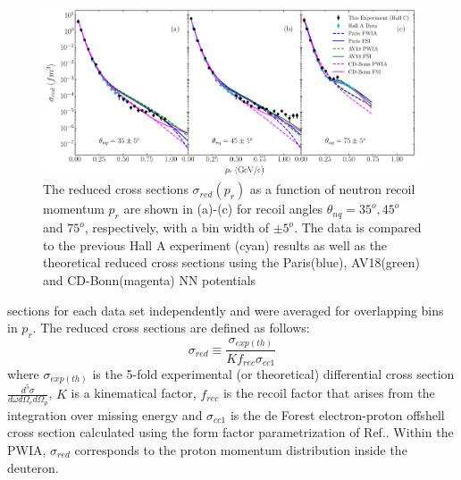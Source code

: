 \begin{center}
\begin{figure}[hb!]
\includegraphics[scale=0.46]{../prl_plots/PRL_plot1.pdf}
\caption{The reduced cross sections $\sigma_{red}(p_{r})$ as a function of neutron recoil momentum $p_{r}$ are shown in (a)-(c) for recoil angles $\theta_{nq}=35^{o}, 45^{o}$ and $75^{o}$, respectively,
with a bin width of $\pm 5^{o}$. The data is compared to the previous Hall A experiment (cyan) results\cite{PhysRevLett.107.262501} as well as the theoretical reduced cross sections using the Paris(blue),
AV18(green) and CD-Bonn(magenta) NN potentials}
\label{fig:fig1}
\end{figure}
\end{center}
\twocolumngrid
\noindent sections for each data set independently and were averaged for overlapping bins in $p_{r}$. The reduced cross sections are defined as follows:
\begin{equation}
\sigma_{red} \equiv \frac{\sigma_{exp(th)}}{Kf_{rec}\sigma_{cc1}}
\label{eq:1}
\end{equation}
where $\sigma_{exp(th)}$ is the 5-fold experimental (or theoretical) differential cross section $\frac{d^{5}\sigma}{d\omega d\Omega_{e} d\Omega_{p}}$, $K$ is a kinematical factor, $f_{rec}$ is the recoil factor that arises from the
integration over missing energy and $\sigma_{cc1}$ is the de Forest\cite{DEFOREST1983} electron-proton offshell cross section calculated using the form factor parametrization of Ref.\cite{PhysRevC.69.022201}.
Within the PWIA, $\sigma_{red}$ corresponds to the proton momentum distribution inside the deuteron. \\

